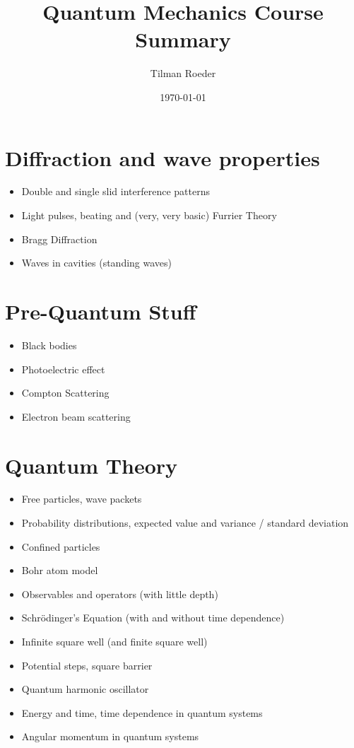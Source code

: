 \documentclass[10pt,a4paper]{article}
\title{Quantum Mechanics Course Summary}
\author{Tilman Roeder}
\date{\today{}}
\begin{document}
  
  \maketitle{}

  \section{Diffraction and wave properties}
  \begin{itemize}
    \item Double and single slid interference patterns
    \item Light pulses, beating and (very, very basic) Furrier Theory
    \item Bragg Diffraction
    \item Waves in cavities (standing waves)
  \end{itemize}

  \section{Pre-Quantum Stuff}
  \begin{itemize}
    \item Black bodies
    \item Photoelectric effect
    \item Compton Scattering
    \item Electron beam scattering
  \end{itemize}

  \section{Quantum Theory}
  \begin{itemize}
    \item Free particles, wave packets
    \item Probability distributions, expected value and variance / standard deviation
    \item Confined particles
    \item Bohr atom model
    \item Observables and operators (with little depth)
    \item Schrödinger's Equation (with and without time dependence)
    \item Infinite square well (and finite square well)
    \item Potential steps, square barrier
    \item Quantum harmonic oscillator
    \item Energy and time, time dependence in quantum systems
    \item Angular momentum in quantum systems
  \end{itemize}
\end{document}
